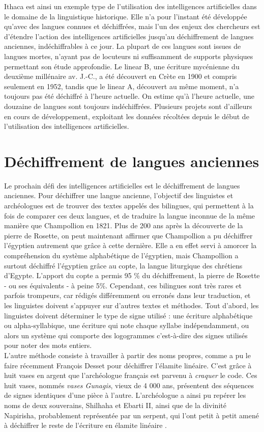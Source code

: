 \documentclass[12pt, french, twoside]{report}
\begin{document}
Ithaca est ainsi un exemple type de l'utilisation des intelligences artificielles dans le domaine de la linguistique historique. Elle n'a pour l'instant été développée qu'avec des langues connues et déchiffrées, mais l'un des enjeux des chercheurs est d'étendre l'action des intelligences artificielles jusqu'au déchiffrement de langues anciennes, indéchiffrables à ce jour. La plupart de ces langues sont issues de langues mortes, n'ayant pas de locuteurs ni suffisamment de supports physiques permettant son étude approfondie. Le linear B, une écriture mycénienne du deuxième millénaire av. J.-C., a été découvert en Crète en 1900 et compris seulement en 1952, tandis que le linear A, découvert au même moment, n'a toujours pas été déchiffré à l'heure actuelle. On estime qu'à l'heure actuelle, une douzaine de langues sont toujours indéchiffrées. Plusieurs projets sont d'ailleurs en cours de développement, exploitant les données récoltées depuis le début de l'utilisation des intelligences artificielles. 

\section{Déchiffrement de langues anciennes}
Le prochain défi des intelligences artificielles est le déchiffrement de langues anciennes.  Pour déchiffrer une langue ancienne, l'objectif des linguistes et archéologues est de trouver des textes appelés des \og bilingues\fg, qui permettent à la fois de comparer ces deux langues, et de traduire la langue inconnue de la même manière que Champollion en 1821. Plus de 200 ans après la découverte de la pierre de Rosette, on peut maintenant affirmer que Champollion a pu déchiffrer l'égyptien autrement que grâce à cette dernière.  Elle a en effet servi à amorcer la compréhension du système alphabétique de l'égyptien, mais Champollion a surtout déchiffré l'égyptien grâce au copte, la langue liturgique des chrétiens d'Egypte. L'apport du copte a permis 95 \% du déchiffrement, la pierre de Rosette - ou ses équivalents - à peine 5\%. Cependant, ces bilingues sont très rares et parfois trompeurs, car rédigés différemment ou erronés dans leur traduction, et les linguistes doivent s'appuyer sur d'autres textes et méthodes. Tout d'abord, les linguistes doivent déterminer le type de signe utilisé : une écriture alphabétique ou alpha-syllabique, une écriture qui note chaque syllabe indépendamment, ou alors un système qui comporte des logogrammes c'est-à-dire des signes utilisés pour noter des mots entiers.\\
\indent L'autre méthode consiste à travailler à partir des noms propres, comme a pu le faire récemment François Desset pour déchiffrer l'élamite linéaire. C'est grâce à huit vases en argent que l'archéologue français est parvenu à \textit{craquer} le code. Ces huit vases, nommés \textit{vases Gunagis}, vieux de 4 000 ans, présentent des séquences de signes identiques d'une pièce à l'autre. L'archéologue a ainsi pu repérer les noms de deux souverains, Shilhaha et Ebarti II, ainsi que de la divinité Napirisha, probablement représentée par un serpent, qui l'ont petit à petit amené à déchiffrer le reste de l'écriture en élamite linéaire \cite{linear-elamite-writing}.\\
\end{document}
